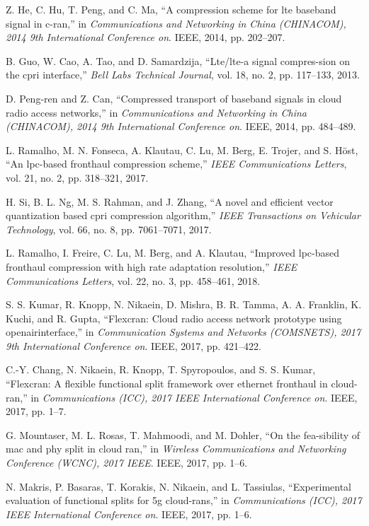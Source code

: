 \begin{multicols}{2}
\begin{thebibliography}{99}
 Z. He, C. Hu, T. Peng, and C. Ma, “A compression scheme for lte baseband signal in c-ran,” in \textit{Communications and Networking in China (CHINACOM), 2014 9th International Conference on}. IEEE, 2014, pp. 202–207.

 B. Guo, W. Cao, A. Tao, and D. Samardzija, “Lte/lte-a signal compres-sion on the cpri interface,” \textit{Bell Labs Technical Journal}, vol. 18, no. 2, pp. 117–133, 2013.

 D. Peng-ren and Z. Can, “Compressed transport of baseband signals in cloud radio access networks,” in \textit{Communications and Networking in China (CHINACOM), 2014 9th International Conference on}. IEEE, 2014, pp. 484–489.

 L. Ramalho, M. N. Fonseca, A. Klautau, C. Lu, M. Berg, E. Trojer, and S. Höst, “An lpc-based fronthaul compression scheme,” \textit{IEEE Communications Letters}, vol. 21, no. 2, pp. 318–321, 2017.

 H. Si, B. L. Ng, M. S. Rahman, and J. Zhang, “A novel and efficient vector quantization based cpri compression algorithm,” \textit{IEEE Transactions on Vehicular Technology}, vol. 66, no. 8, pp. 7061–7071, 2017.

 L. Ramalho, I. Freire, C. Lu, M. Berg, and A. Klautau, “Improved lpc-based fronthaul compression with high rate adaptation resolution,” \textit{IEEE Communications Letters}, vol. 22, no. 3, pp. 458–461, 2018.

 S. S. Kumar, R. Knopp, N. Nikaein, D. Mishra, B. R. Tamma, A. A. Franklin, K. Kuchi, and R. Gupta, “Flexcran: Cloud radio access network prototype using openairinterface,” in \textit{Communication Systems and Networks (COMSNETS), 2017 9th International Conference on}. IEEE, 2017, pp. 421–422.

 C.-Y. Chang, N. Nikaein, R. Knopp, T. Spyropoulos, and S. S. Kumar, “Flexcran: A flexible functional split framework over ethernet fronthaul in cloud-ran,” in \textit{Communications (ICC), 2017 IEEE International Conference on}. IEEE, 2017, pp. 1–7.

 G. Mountaser, M. L. Rosas, T. Mahmoodi, and M. Dohler, “On the fea-sibility of mac and phy split in cloud ran,” in \textit{Wireless Communications and Networking Conference (WCNC), 2017 IEEE}. IEEE, 2017, pp. 1–6.

 N. Makris, P. Basaras, T. Korakis, N. Nikaein, and L. Tassiulas, “Experimental evaluation of functional splits for 5g cloud-rans,” in \textit{Communications (ICC), 2017 IEEE International Conference on}. IEEE, 2017, pp. 1–6.


\end{thebibliography}
\end{multicols}
